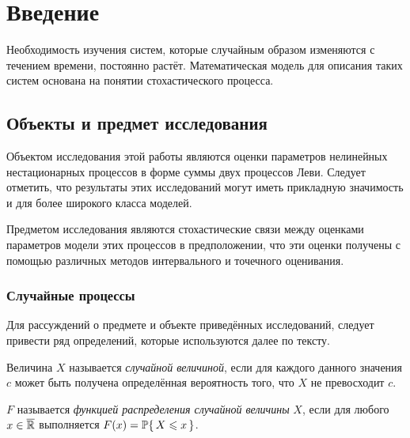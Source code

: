 \chapter{Введение}							%

Необходимость изучения систем, которые случайным образом изменяются с течением времени, постоянно растёт. Математическая модель для описания таких систем основана на понятии стохастического процесса.

\section*{Объекты и предмет исследования}
Объектом исследования этой работы являются оценки параметров нелинейных нестационарных процессов в форме суммы двух процессов Леви. Следует отметить, что результаты этих исследований могут иметь прикладную значимость и для более широкого класса моделей.

Предметом исследования являются стохастические связи между оценками параметров модели этих процессов в предположении, что эти оценки получены с помощью различных методов интервального и точечного оценивания.

\subsection*{Случайные процессы}

Для рассуждений о предмете и объекте приведённых исследований, следует привести ряд определений, которые используются далее по тексту.

\begin{define}
	Величина $X$ называется \emph{случайной величиной}, если для каждого данного значения $c$ может быть получена определённая вероятность того, что $X$ не превосходит $c$.
\end{define}

\begin{define}
	$F$ называется \emph{функцией распределения случайной величины} $X$, если для любого $x \in \exR$ выполняется $F(x) = \P\{\, X \leqslant x \,\}$.
\end{define}

